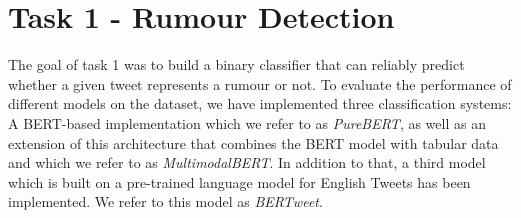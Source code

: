 \documentclass[11pt,a4paper]{article}
\begin{document}
\section{Task 1 - Rumour Detection}
\label{sec:task_1_rumour_detection}
The goal of task 1 was to build a binary classifier that can reliably predict whether a given tweet represents a rumour or not.
\newline
To evaluate the performance of different models on the dataset, we have implemented three classification systems: A BERT-based implementation which we refer to as \textit{PureBERT}, as well as an extension of this architecture that combines the BERT model with tabular data and which we refer to as \textit{MultimodalBERT}.
\newline
In addition to that, a third model which is built on a pre-trained language model for English Tweets \citep{RN683} has been implemented. We refer to this model as \textit{BERTweet}.
\end{document}
